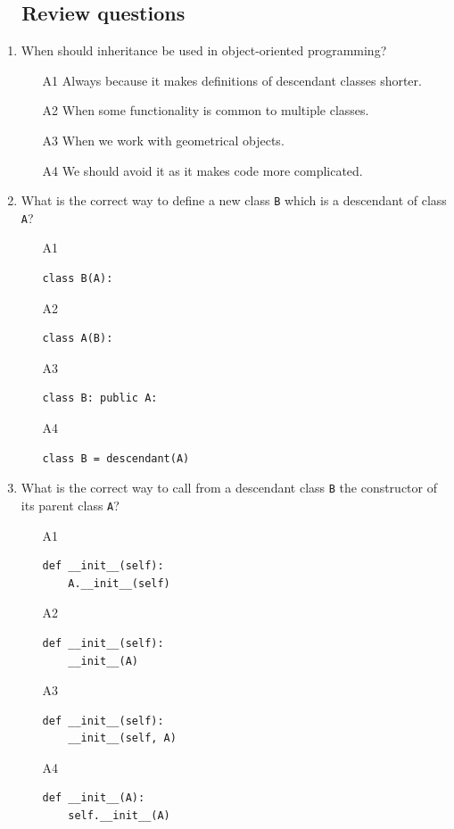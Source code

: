 \subsection{\ \ Review questions}

\begin{enumerate}
\item When should inheritance be used in object-oriented programming?
\begin{enumerate}
\item[A1] Always because it makes definitions of descendant classes shorter.
\item[A2] When some functionality is common to multiple classes.
\item[A3] When we work with geometrical objects. 
\item[A4] We should avoid it as it makes code more complicated.
\end{enumerate}
\item What is the correct way to define a new class {\tt B} which is a descendant of 
      class {\tt A}?
\begin{enumerate}
\item[A1] 
\begin{verbatim}
class B(A):
\end{verbatim}
\item[A2] 
\begin{verbatim}
class A(B):
\end{verbatim}
\item[A3] 
\begin{verbatim}
class B: public A:
\end{verbatim}
\item[A4] 
\begin{verbatim}
class B = descendant(A)
\end{verbatim}
\end{enumerate}
\item What is the correct way to call from a descendant class {\tt B} the constructor of its parent class 
      {\tt A}?
\begin{enumerate}
\item[A1] 
\begin{verbatim}
def __init__(self):
    A.__init__(self)
\end{verbatim}
\item[A2] 
\begin{verbatim}
def __init__(self):
    __init__(A)
\end{verbatim}
\item[A3] 
\begin{verbatim}
def __init__(self):
    __init__(self, A)
\end{verbatim}
\item[A4] 
\begin{verbatim}
def __init__(A):
    self.__init__(A)
\end{verbatim}
\end{enumerate}
\end{enumerate}


